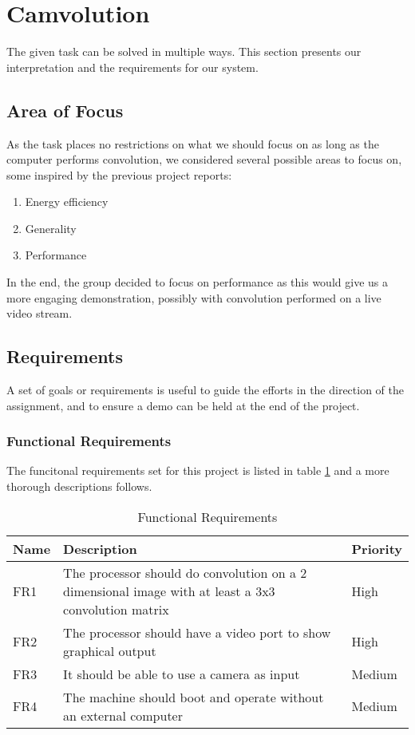\section{Camvolution}
The given task can be solved in multiple ways. This section presents our interpretation and the requirements for our system.

\subsection{Area of Focus}
As the task places no restrictions on what we should focus on as long as the computer performs convolution, we considered several possible areas to focus on, some inspired by the previous project reports:

\begin{enumerate}
    \item Energy efficiency
    \item Generality
    \item Performance
\end{enumerate}

In the end, the group decided to focus on performance as this would give us a more engaging demonstration, possibly with convolution performed on a live video stream.

\subsection{Requirements}
A set of goals or requirements is useful to guide the efforts in the direction of the assignment, and to ensure a demo can be held at the end of the project.

\subsubsection{Functional Requirements}
The funcitonal requirements set for this project is listed in table \ref{tab:functional-requirements} and a more thorough descriptions follows.

\begin{table}[]
    \centering
    \label{tab:functional-requirements}
    \begin{tabular}{lp{12cm}l}
        Name & Description & Priority \\
        \hline
        FR1 &
            The processor should do convolution on a 2 dimensional image with at least a 3x3 convolution matrix &
            High \\
        FR2 &
            The processor should have a video port to show graphical output &
            High \\
        FR3 &
            It should be able to use a camera as input &
            Medium \\
        FR4 &
            The machine should boot and operate without an external computer &
            Medium
    \end{tabular}
    \caption{Functional Requirements}
\end{table}

